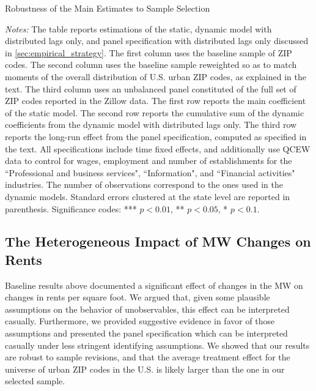 \begin{table}[h!]\centering
	\caption{Robustness of the Main Estimates to Sample Selection}  %
	\label{tab:wgt_unbal_comparison}
	
	\begin{minipage}{0.95\textwidth}\footnotesize
	\vspace{3mm}	
	\textit{Notes:} The table reports estimations of the static, dynamic model with distributed
	lags only, and panel specification with distributed lags only discussed in 
	\autoref{sec:empirical_strategy}. The first column uses the baseline sample of ZIP codes. The 
	second column uses the baseline sample reweighted so as to match moments of the overall 
	distribution of U.S. urban ZIP codes, as explained in the text. The third column uses an 
	unbalanced 	panel constituted of the full set of ZIP codes reported in the Zillow data. The 
	first row reports the main coefficient of the static model. The second row reports the 
	cumulative sum of the dynamic coefficients from the dynamic model with distributed lags only. 
	The third row reports the long-run effect from the panel specification, computed as specified 
	in the text. All specifications include time fixed effects, and additionally use QCEW data to 
	control for wages, employment and number of establishments for the ``Professional and business 
	services", ``Information", and ``Financial activities" industries. The number of observations 
	correspond to the ones used in the dynamic models. 
	Standard errors clustered at the state level are reported in parenthesis. Significance codes: 
	*** $p < 0.01$, ** $p < 0.05$, * $p < 0.1$.
	\end{minipage}
\end{table}



\subsection{The Heterogeneous Impact of MW Changes on Rents}\label{sec:heter}

Baseline results above documented a significant effect of changes in the MW on changes in rents 
per square foot. We argued that, given some plausible assumptions on the behavior of 
unobservables, this effect can be interpreted casually. Furthermore, we provided suggestive 
evidence in favor of those assumptions and presented the panel specification which can be 
interpreted casually under less stringent identifying assumptions. We showed that our results 
are robust to sample revisions, and that the average treatment effect for the universe of urban 
ZIP codes in the U.S. is likely larger than the one in our selected sample. 

